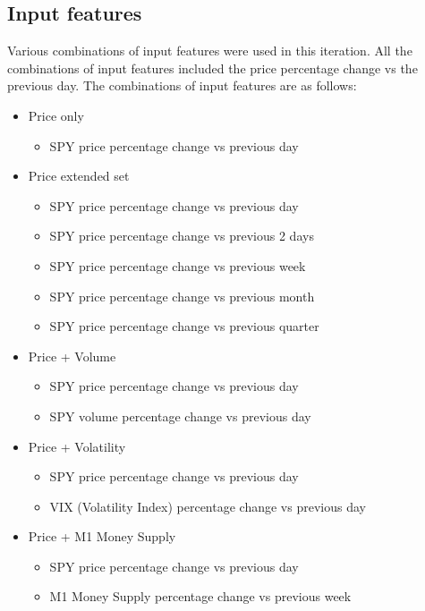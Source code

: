 \subsection{Input features}\label{ssec:iteration5_input_features}
Various combinations of input features were used in this iteration. All the combinations of input features included the
price percentage change vs the previous day. The combinations of input features are as follows:

\begin{itemize}
    \item Price only
    \begin{itemize}
        \item SPY price percentage change vs previous day
    \end{itemize}
    \item Price extended set
    \begin{itemize}
        \item SPY price percentage change vs previous day
        \item SPY price percentage change vs previous 2 days
        \item SPY price percentage change vs previous week
        \item SPY price percentage change vs previous month
        \item SPY price percentage change vs previous quarter
    \end{itemize}
    \item Price + Volume
    \begin{itemize}
        \item SPY price percentage change vs previous day
        \item SPY volume percentage change vs previous day
    \end{itemize}
    \item Price + Volatility
    \begin{itemize}
        \item SPY price percentage change vs previous day
        \item VIX (Volatility Index) percentage change vs previous day
    \end{itemize}
    \item Price + M1 Money Supply
    \begin{itemize}
        \item SPY price percentage change vs previous day
        \item M1 Money Supply percentage change vs previous week

\end{itemize}
\end{itemize}
